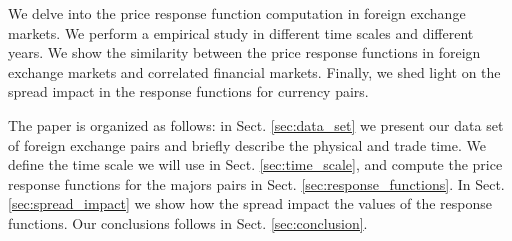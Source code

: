 We delve into the price response function computation in foreign exchange
markets. We perform a empirical study in different time scales and different
years. We show the similarity between the price response functions in foreign
exchange markets and correlated financial markets. Finally, we shed light on
the spread impact in the response functions for currency pairs.

The paper is organized as follows: in Sect. \ref{sec:data_set} we present our
data set of foreign exchange pairs and briefly describe the physical and trade
time. We define the time scale we will use in Sect. \ref{sec:time_scale}, and
compute the price response functions for the majors pairs in Sect.
\ref{sec:response_functions}. In Sect. \ref{sec:spread_impact} we show how
the spread impact the values of the response functions. Our conclusions follows
in Sect. \ref{sec:conclusion}.